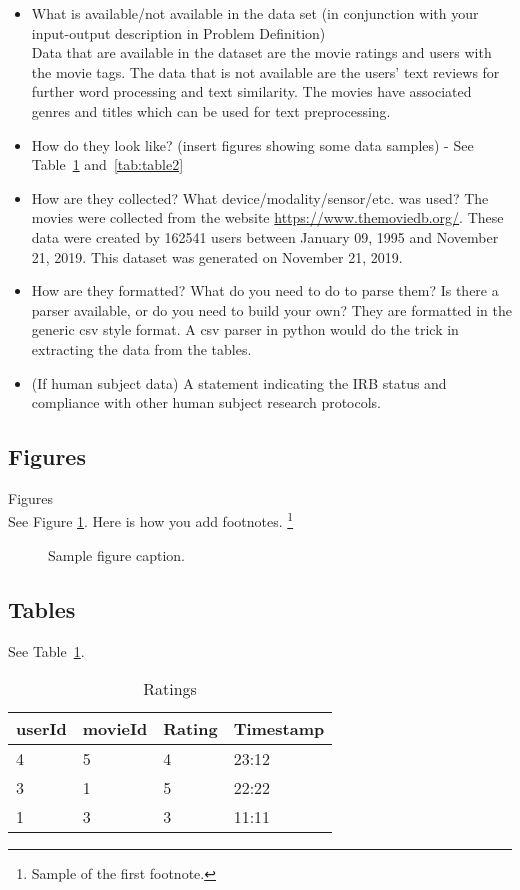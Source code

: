 \documentclass{article}
\begin{document}
\begin{itemize}
\item What is available/not available in the data set (in conjunction with your input-output description in Problem Definition) \\
Data that are available in the dataset are the movie ratings and users with the movie tags. The data that is not available are the users' text reviews for further
word processing and text similarity. The movies have associated genres and titles which can be used for text preprocessing.
\item How do they look like? (insert figures showing some data samples) - See Table~\ref{tab:table1} and~\ref{tab:table2}
\item How are they collected? What device/modality/sensor/etc. was used?
The movies were collected from the website \url{https://www.themoviedb.org/}. These data were created by 162541 users between January 09, 1995 and November 21, 2019. This dataset was generated on November 21, 2019.
\item How are they formatted? What do you need to do to parse them? Is there a parser available, or do you need to build your own?
They are formatted in the generic csv style format. A csv parser in python would do the trick in extracting the data from the tables. 
\item (If human subject data) A statement indicating the IRB status and compliance with other human subject research protocols.
\end{itemize}

\subsection{Figures}
Figures \\
See Figure \ref{fig:fig1}. Here is how you add footnotes. \footnote{Sample of the first footnote.}


\begin{figure}
  \centering
  \fbox{\rule[-.5cm]{4cm}{4cm} \rule[-.5cm]{4cm}{0cm}}
  \caption{Sample figure caption.}
  \label{fig:fig1}
\end{figure}

\subsection{Tables}

See Table~\ref{tab:table1}.

\begin{table}
 \caption{Ratings}
  \centering
  \begin{tabular}{llll}
    \toprule
    userId     & movieId     & Rating & Timestamp \\
    \midrule
    4 & 5  & 4  & 23:12   \\
    3     & 1 & 5     & 22:22 \\
    1     & 3       & 3  & 11:11\\
    \bottomrule
  \end{tabular}
  \label{tab:table1}
\end{table}
\end{document}
